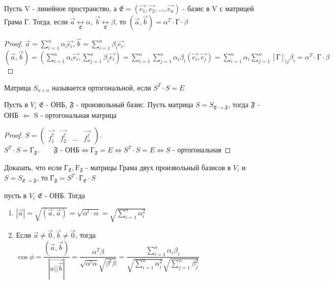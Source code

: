 \begin{theorem}
	Пусть V - линейное пространство, а \(\mathfrak{E} = (\vec{e_1}, \vec{e_2}, \ldots, \vec{e_n})\) - базис в V с матрицей Грама Г. Тогда, если \(\vec{a}\underset{\mathfrak{E}}{\longleftrightarrow}\alpha\), 
	\(\vec{b}\underset{\mathfrak{E}}{\longleftrightarrow}\beta\), то \((\vec{a}, \vec{b}) = \alpha^T\cdot\text{Г}\cdot\beta\)
\end{theorem}
\begin{proof}
	\(\vec{a} = \sum_{i = 1}^{n}\alpha_i\vec{e_i}, \vec{b} = \sum_{i = 1}^{n}\beta_i\vec{e_i}\). \\[5mm]
	\((\vec{a}, \vec{b}) = (\sum_{i = 1}^{n}\alpha_i\vec{e_i}, \sum_{j = 1}^{n}\beta_i\vec{e_i}) = \sum_{i = 1}^{n}\sum_{j = 1}^{n}\alpha_i\beta_i(\vec{e_i}, \vec{e_j}) = \sum_{i = 1}^{n}\alpha_i\sum_{j = 1}^{n}[\text{Г}]_{ij}\beta_i = \alpha^T\cdot\text{Г}\cdot\beta\)
\end{proof}
\begin{definition}
	Матрица \(S_{n\times n} \) называется ортогональной, если \(S^T\cdot S = E\)
\end{definition}
\begin{proposition}
	Пусть в \(V_i\) \(\mathfrak{E}\) - ОНБ, \(\mathfrak{F}\) - произвольный базис. Пусть матрица \(S = S_{\mathfrak{E}\to\mathfrak{F}}\), тогда \(\mathfrak{F}\) - ОНБ \(\Longleftarrow\) S - ортогональная матрица
\end{proposition}
\begin{proof}
	\(S = \begin{pmatrix}
		\vec{f_1^{\uparrow}} & \vec{f_2^{\uparrow}} & \ldots & \vec{f_n^{\uparrow}}
	\end{pmatrix}\). \\[5mm]
	\(S^T\cdot S = \text{Г}_{\mathfrak{F}}.\qquad \mathfrak{F}\text{ - ОНБ} \Longleftrightarrow \text{Г}_{\mathfrak{F}} = E \Longleftrightarrow S^T\cdot S = E \Longleftrightarrow S\text{ - ортогональная}\)
\end{proof}
\begin{exercise}
	Доказать, что если \(\text{Г}_{\mathfrak{E}}, \text{F}_{\mathfrak{F}}\) - матрицы Грама двух произвольный базисов в \(V_i\) и \(S = S_{\mathfrak{E}\to\mathfrak{F}}\), то \(\text{Г}_{\mathfrak{F}} = S^T\cdot\text{Г}_{\mathfrak{E}}\cdot S\)
\end{exercise}
\begin{proposition}
	пусть в \(V_i\) \(\mathfrak{E}\) - ОНБ. Тогда 
	\begin{enumerate}
		\item \(|\vec{a}| = \sqrt{(\vec{a}, \vec{a})} = \sqrt{\alpha^t\cdot\alpha} = \sqrt{\sum_{i = 1}^{n}\alpha_i^2}\)
		\item Если $\vec{a}\ne\vec{0}, \vec{b}\ne\vec{0}$, тогда \(\cos\phi = \dfrac{(\vec{a}, \vec{b})}{|\vec{a||\vec{b}}|} = \dfrac{\alpha^T\beta}{\sqrt{\alpha^t\alpha}\sqrt{\beta^t\beta}} = \dfrac{\sum_{i = 1}^{n}\alpha_i\beta_i}{\sqrt{\sum_{i = 1}^{n}\alpha_i^2}\sqrt{\sum_{j = 1}^{n}\beta_j^2}}\)
	\end{enumerate}
\end{proposition}
